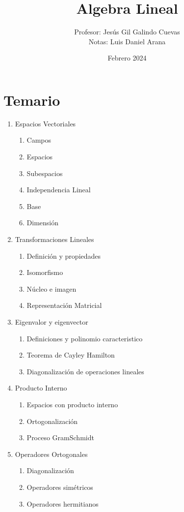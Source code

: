\documentclass{IEEEtran}
\title{Algebra Lineal}
\author{Profesor: Jes\'{u}s Gil Galindo Cuevas\\Notas: Luis Daniel Arana}
\date{Febrero 2024}
\begin{document}
\maketitle
\section*{Temario}
\begin{enumerate}
	\item Espacios Vectoriales
	\begin{enumerate}[label*=\arabic*]
	\item Campos	
	\item Espacios
	\item Subespacios
	\item Independencia Lineal
	\item Base
	\item Dimensi\'{o}n
\end{enumerate}
	\item Transformaciones Lineales
\begin{enumerate}[label*=\arabic*]
	\item Definici\'{o}n y propiedades
	\item Isomorfismo
	\item N\'{u}cleo e imagen
	\item Representaci\'{o}n Matricial
\end{enumerate}
	\item Eigenvalor y eigenvector
\begin{enumerate}[label*=\arabic*]
	\item Definiciones y polinomio caracteristico 
	\item Teorema de Cayley Hamilton
	\item Diagonalizaci\'{o}n de operaciones lineales
\end{enumerate}
	\item Producto Interno
\begin{enumerate}[label*=\arabic*]
	\item Espacios con producto interno 
	\item Ortogonalizaci\'{o}n  
	\item Proceso GramSchmidt
\end{enumerate}
\item Operadores Ortogonales
\begin{enumerate}[label*=\arabic*]
	\item Diagonalizaci\'{o}n
	\item Operadores sim\'{e}tricos
	\item Operadores hermitianos
\end{enumerate}
\end{enumerate}
%
\end{document}
